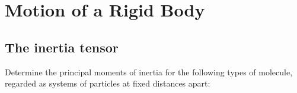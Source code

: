 \chapter{Motion of a Rigid Body}

\section{The inertia tensor}


\begin{problem}[title={Principal moments of inertia of molecules}]
{
Determine the principal moments of inertia for the following types of molecule, regarded as systems of particles at fixed distances apart:
}{}{}
\end{problem}
